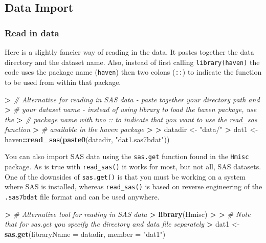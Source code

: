 \documentclass[
]{book}
\newenvironment{Shaded}{\begin{snugshade}}{\end{snugshade}}
\newcommand{\CommentTok}[1]{\textcolor[rgb]{0.56,0.35,0.01}{\textit{#1}}}
\newcommand{\DataTypeTok}[1]{\textcolor[rgb]{0.13,0.29,0.53}{#1}}
\newcommand{\ErrorTok}[1]{\textcolor[rgb]{0.64,0.00,0.00}{\textbf{#1}}}
\newcommand{\KeywordTok}[1]{\textcolor[rgb]{0.13,0.29,0.53}{\textbf{#1}}}
\newcommand{\NormalTok}[1]{#1}
\newcommand{\OperatorTok}[1]{\textcolor[rgb]{0.81,0.36,0.00}{\textbf{#1}}}
\newcommand{\StringTok}[1]{\textcolor[rgb]{0.31,0.60,0.02}{#1}}
\begin{document}
\hypertarget{alt-import}{%
\subsection{Data Import}\label{alt-import}}

\hypertarget{read-in-data}{%
\subsubsection{Read in data}\label{read-in-data}}

Here is a slightly fancier way of reading in the data. It pastes together the data directory and the dataset name. Also, instead of first calling \texttt{library(haven)} the code uses the package name (\texttt{haven}) then two colons (\texttt{::}) to indicate the function to be used from within that package.

\begin{Shaded}
\begin{Highlighting}[]
\OperatorTok{>}\StringTok{ }\CommentTok{# Alternative for reading in SAS data - paste together your directory path and}
\ErrorTok{>}\StringTok{ }\CommentTok{# your dataset name - instead of using library to load the haven package, use the}
\ErrorTok{>}\StringTok{ }\CommentTok{# package name with two :: to indicate that you want to use the read_sas function}
\ErrorTok{>}\StringTok{ }\CommentTok{# available in the haven package}
\ErrorTok{>}\StringTok{ }
\ErrorTok{>}\StringTok{ }\NormalTok{datadir <-}\StringTok{ "data/"}
\OperatorTok{>}\StringTok{ }\NormalTok{dat1 <-}\StringTok{ }\NormalTok{haven}\OperatorTok{::}\KeywordTok{read_sas}\NormalTok{(}\KeywordTok{paste0}\NormalTok{(datadir, }\StringTok{"dat1.sas7bdat"}\NormalTok{))}
\end{Highlighting}
\end{Shaded}

You can also import SAS data using the \texttt{sas.get} function found in the \texttt{Hmisc} package. As is true with \texttt{read\_sas()} it works for most, but not all, SAS datasets. One of the downsides of \texttt{sas.get()} is that you must be working on a system where SAS is installed, whereas \texttt{read\_sas()} is based on reverse engineering of the \texttt{.sas7bdat} file format and can be used anywhere.

\begin{Shaded}
\begin{Highlighting}[]
\OperatorTok{>}\StringTok{ }\CommentTok{# Alternative tool for reading in SAS data}
\ErrorTok{>}\StringTok{ }\KeywordTok{library}\NormalTok{(Hmisc)}
\OperatorTok{>}\StringTok{ }
\ErrorTok{>}\StringTok{ }\CommentTok{# Note that for sas.get you specify the directory and data file separately}
\ErrorTok{>}\StringTok{ }\NormalTok{dat1 <-}\StringTok{ }\KeywordTok{sas.get}\NormalTok{(}\DataTypeTok{libraryName =}\NormalTok{ datadir, }\DataTypeTok{member =} \StringTok{"dat1"}\NormalTok{)}
\end{Highlighting}
\end{Shaded}
\end{document}
